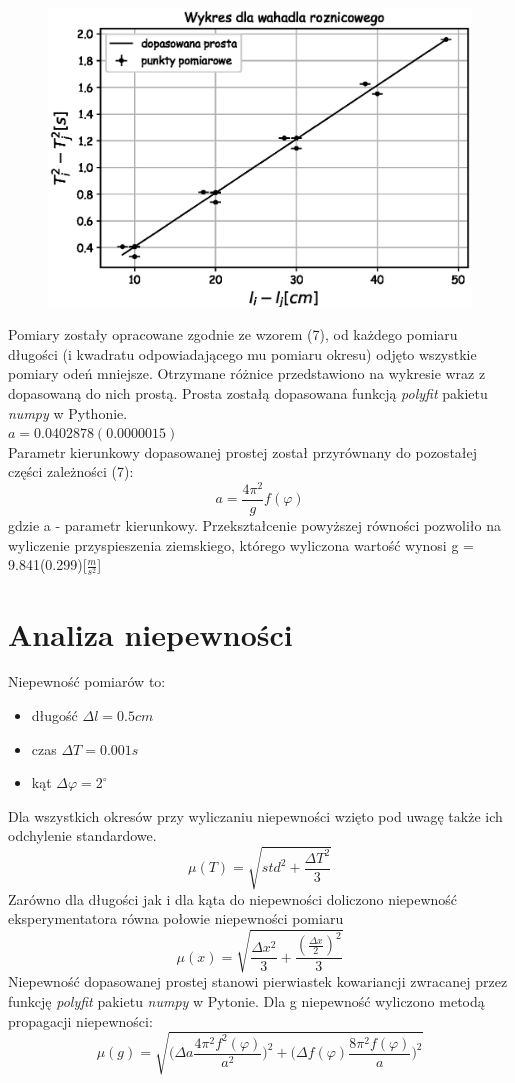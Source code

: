 \documentclass[a4paper,10pt]{article}
\begin{document}
\begin{figure}[H]
    \includegraphics{./Wykres_roznicowe.eps}
    \caption{}
    \label{}
\end{figure}
Pomiary zostały opracowane zgodnie ze wzorem (7), od każdego pomiaru długości (i kwadratu odpowiadającego mu pomiaru okresu) odjęto wszystkie pomiary odeń mniejsze. Otrzymane różnice przedstawiono na wykresie wraz z dopasowaną do nich prostą. Prosta zostałą dopasowana funkcją \emph{polyfit} pakietu \emph{numpy} 
w Pythonie.\\
$a = 0.0402878(0.0000015)$
\\ 
Parametr kierunkowy dopasowanej prostej został przyrównany do pozostałej części zależności (7):
\begin{equation}
a = \frac{4 \pi^2}{g} f(\varphi)
\end{equation}
gdzie a - parametr kierunkowy. Przekształcenie powyższej równości pozwoliło na wyliczenie przyspieszenia ziemskiego, którego wyliczona wartość wynosi g = 9.841(0.299)[$\frac{m}{s^2}$]
\section{Analiza niepewności}
Niepewność pomiarów to:
\begin{itemize}
	\item długość $\Delta l = 0.5 cm$
	\item czas $\Delta T = 0.001 s$
	\item kąt $\Delta \varphi = 2 ^\circ$
\end{itemize}
Dla wszystkich okresów przy wyliczaniu niepewności wzięto pod uwagę także ich odchylenie standardowe. 
$$\mu(T) = \sqrt{std^2 + \frac{\Delta T^2}{3}}$$
Zarówno dla długości jak i dla kąta do niepewności doliczono niepewność eksperymentatora równa połowie niepewności pomiaru
$$\mu(x) = \sqrt{\frac{\Delta x^2}{3}+\frac{(\frac{\Delta x}{2})^2}{3}}$$
Niepewność dopasowanej prostej stanowi pierwiastek kowariancji zwracanej przez funkcję \emph{polyfit} pakietu \emph{numpy} w Pytonie. Dla g niepewność wyliczono metodą propagacji niepewności:
$$\mu(g) = \sqrt{\bigg(\Delta a \frac{4 \pi^2 f^2(\varphi)}{a^2}\bigg)^2+\bigg(\Delta f(\varphi) \frac{8 \pi^2 f(\varphi)}{a}\bigg)^2}$$
\end{document}
